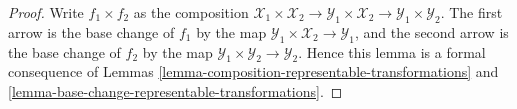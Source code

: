 \documentclass{stacks-project}
\theoremstyle{plain}
\theoremstyle{definition}
\theoremstyle{remark}
\numberwithin{equation}{subsection}
\begin{document}
\begin{proof}
Write $f_1 \times f_2$ as the composition
$\mathcal{X}_1 \times \mathcal{X}_2 \to
\mathcal{Y}_1 \times \mathcal{X}_2 \to
\mathcal{Y}_1 \times \mathcal{Y}_2$.
The first arrow is the base change of $f_1$ by the map
$\mathcal{Y}_1 \times \mathcal{X}_2 \to \mathcal{Y}_1$, and the second arrow
is the base change of $f_2$ by the map
$\mathcal{Y}_1 \times \mathcal{Y}_2 \to \mathcal{Y}_2$.
Hence this lemma is a formal
consequence of Lemmas \ref{lemma-composition-representable-transformations}
and \ref{lemma-base-change-representable-transformations}.
\end{proof}
\end{document}
